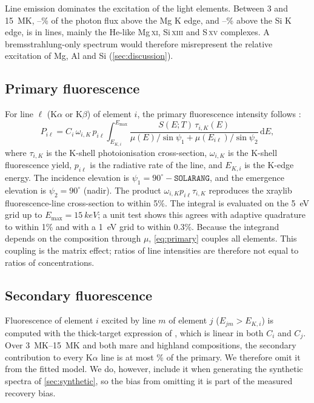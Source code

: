 Line emission dominates the excitation of the light elements. Between 3 and \SI{15}{MK}, \LineFracMgLo--\LineFracMgHi\% of the photon flux above the Mg K edge, and \LineFracSiLo--\LineFracSiHi\% above the Si K edge, is in lines, mainly the He-like Mg\,\textsc{xi}, Si\,\textsc{xiii} and S\,\textsc{xv} complexes. A bremsstrahlung-only spectrum would therefore misrepresent the relative excitation of Mg, Al and Si (\cref{sec:discussion}).

\subsection{Primary fluorescence}\label{sec:primary}
For line $\ell$ (K$\alpha$ or K$\beta$) of element $i$, the primary fluorescence intensity follows \citet{Sherman1955}:
\begin{equation}
P_{i\ell} = C_i\,\omega_{i,K}\,p_{i\ell}\int_{E_{K,i}}^{E_\mathrm{max}}
\frac{S(E;T)\,\tau_{i,K}(E)}{\mu(E)/\sin\psi_1 + \mu(E_{i\ell})/\sin\psi_2}\,\mathrm{d}E ,
\label{eq:primary}
\end{equation}
where $\tau_{i,K}$ is the K-shell photoionisation cross-section, $\omega_{i,K}$ is the K-shell fluorescence yield, $p_{i\ell}$ is the radiative rate of the line, and $E_{K,i}$ is the K-edge energy. The incidence elevation is $\psi_1 = 90^\circ - \texttt{SOLARANG}$, and the emergence elevation is $\psi_2=90^\circ$ (nadir). The product $\omega_{i,K}p_{i\ell}\tau_{i,K}$ reproduces the xraylib fluorescence-line cross-section to within 5\%. The integral is evaluated on the \SI{5}{eV} grid up to $E_\mathrm{max}=\SI{15}{keV}$; a unit test shows this agrees with adaptive quadrature to within 1\% and with a \SI{1}{eV} grid to within 0.3\%. Because the integrand depends on the composition through $\mu$, \cref{eq:primary} couples all elements. This coupling is the matrix effect; ratios of line intensities are therefore not equal to ratios of concentrations.

\subsection{Secondary fluorescence}\label{sec:secondary}
Fluorescence of element $i$ excited by line $m$ of element $j$ ($E_{jm}>E_{K,i}$) is computed with the thick-target expression of \citet{deBoer1990}, which is linear in both $C_i$ and $C_j$. Over \SIrange{3}{15}{MK} and both mare and highland compositions, the secondary contribution to every K$\alpha$ line is at most \SecMaxPct\% of the primary. We therefore omit it from the fitted model. We do, however, include it when generating the synthetic spectra of \cref{sec:synthetic}, so the bias from omitting it is part of the measured recovery bias.


